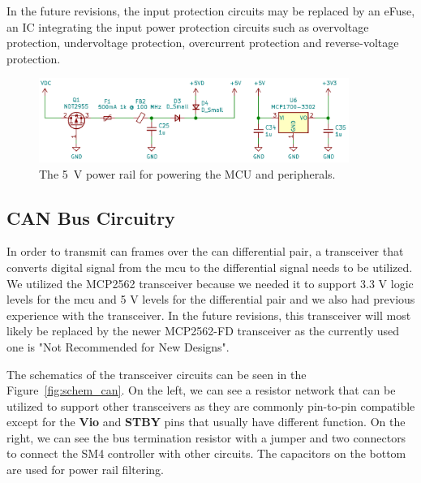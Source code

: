 In the future revisions, the input protection circuits may be replaced by an eFuse\cite{greatscott_best_2021,texas_instruments_efuse_2021}, an IC integrating the input power protection circuits such as overvoltage protection, undervoltage protection, overcurrent protection and reverse-voltage protection.

\begin{figure}[H]
    \centering
    \includegraphics[width=0.9\textwidth]{obrazky/schem_power}
    \caption{The 5~V power rail for powering the MCU and peripherals.}
    \label{fig:power}
\end{figure}

\subsection{CAN Bus Circuitry}
\label{subsec:can_circuitry}
In order to transmit \acs{can} frames over the \acs{can} differential pair, a transceiver that converts digital signal from the \acs{mcu} to the differential signal needs to be utilized.
We utilized the MCP2562 transceiver because we needed it to support 3.3 V logic levels for the \acs{mcu} and 5 V levels for the differential pair and we also had previous experience with the transceiver.
In the future revisions, this transceiver will most likely be replaced by the newer MCP2562-FD transceiver as the currently used one is "Not Recommended for New Designs"\cite{microchip_mcp2562_nodate}.

The schematics of the transceiver circuits can be seen in the Figure~\ref{fig:schem_can}.
On the left, we can see a resistor network that can be utilized to support other transceivers as they are commonly pin-to-pin compatible except for the \textbf{Vio} and \textbf{STBY} pins that usually have different function.
On the right, we can see the bus termination resistor with a jumper and two connectors to connect the SM4 controller with other circuits.
The capacitors on the bottom are used for power rail filtering.

